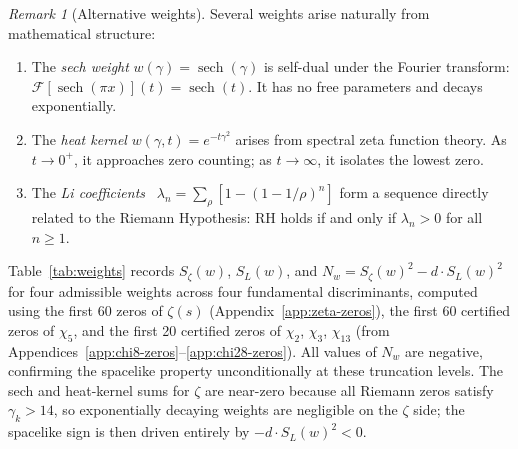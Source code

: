 \documentclass[12pt,reqno]{amsart}
\theoremstyle{plain}
\theoremstyle{definition}
\theoremstyle{remark}
\newtheorem{remark}[theorem]{Remark}
\begin{document}
\begin{remark}[Alternative weights]
Several weights arise naturally from mathematical structure:
\begin{enumerate}[label=\textup{(\alph*)}]
\item The \emph{sech weight} $w(\gamma) = \operatorname{sech}(\gamma)$ is self-dual under the Fourier transform: $\mathcal{F}[\operatorname{sech}(\pi x)](t) = \operatorname{sech}(t)$. It has no free parameters and decays exponentially.
\item The \emph{heat kernel} $w(\gamma, t) = e^{-t\gamma^2}$ arises from spectral zeta function theory. As $t \to 0^+$, it approaches zero counting; as $t \to \infty$, it isolates the lowest zero.
\item The \emph{Li coefficients}~\cite{Li1997} $\lambda_n = \sum_\rho [1 - (1 - 1/\rho)^n]$ form a sequence directly related to the Riemann Hypothesis: RH holds if and only if $\lambda_n > 0$ for all $n \geq 1$.
\end{enumerate}

Table~\ref{tab:weights} records $S_\zeta(w)$, $S_L(w)$, and $N_w = S_\zeta(w)^2 - d \cdot S_L(w)^2$ for four admissible weights across four fundamental discriminants, computed using the first 60 zeros of $\zeta(s)$ (Appendix~\ref{app:zeta-zeros}), the first 60 certified zeros of $\chi_5$, and the first 20 certified zeros of $\chi_2$, $\chi_3$, $\chi_{13}$ (from Appendices~\ref{app:chi8-zeros}--\ref{app:chi28-zeros}).  All values of $N_w$ are negative, confirming the spacelike property unconditionally at these truncation levels.  The sech and heat-kernel sums for $\zeta$ are near-zero because all Riemann zeros satisfy $\gamma_k > 14$, so exponentially decaying weights are negligible on the $\zeta$ side; the spacelike sign is then driven entirely by $-d\cdot S_L(w)^2 < 0$.
\end{remark}
\end{document}
